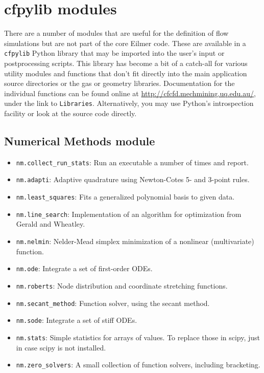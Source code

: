 \documentclass[12pt,a4paper,twoside]{article}
\begin{document}
\section{cfpylib modules}
\label{cfpylib-sec}
There are a number of modules that are useful for the definition of flow
simulations but are not part of the core Eilmer code.
These are available in a \verb!cfpylib! Python library that may be imported into the
user's input or postprocessing scripts.
This library has become a bit of a catch-all 
for various utility modules and functions that don't fit
directly into the main application source directories or 
the gas or geometry libraries.
Documentation for the individual functions can be found online 
at \url{http://cfcfd.mechmining.uq.edu.au/}, under the link to \verb!Libraries!.
Alternatively, you may use Python's introspection facility or 
look at the source code directly. 

\subsection{Numerical Methods module}
  \begin{itemize}
   \item \verb!nm.collect_run_stats!: Run an executable a number of times and report.
   \item \verb!nm.adapti!: Adaptive quadrature using Newton-Cotes 5- and 3-point rules.
   \item \verb!nm.least_squares!: Fits a generalized polynomial basis to given data.
   \item \verb!nm.line_search!: Implementation of an algorithm for optimization from Gerald and Wheatley.
   \item \verb!nm.nelmin!: Nelder-Mead simplex minimization of a nonlinear (multivariate) function.
   \item \verb!nm.ode!: Integrate a set of first-order ODEs.
   \item \verb!nm.roberts!: Node distribution and coordinate stretching functions.
   \item \verb!nm.secant_method!: Function solver, using the secant method.
   \item \verb!nm.sode!: Integrate a set of stiff ODEs.
   \item \verb!nm.stats!: Simple statistics for arrays of values. 
         To replace those in scipy, just in case scipy is not installed.
   \item \verb!nm.zero_solvers!: A small collection of function solvers, including bracketing.
  \end{itemize}
\end{document}

